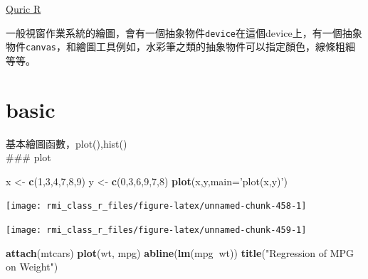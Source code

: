 \documentclass[]{book}
\newenvironment{Shaded}{\begin{snugshade}}{\end{snugshade}}
\newcommand{\DataTypeTok}[1]{\textcolor[rgb]{0.13,0.29,0.53}{#1}}
\newcommand{\DecValTok}[1]{\textcolor[rgb]{0.00,0.00,0.81}{#1}}
\newcommand{\KeywordTok}[1]{\textcolor[rgb]{0.13,0.29,0.53}{\textbf{#1}}}
\newcommand{\NormalTok}[1]{#1}
\newcommand{\OperatorTok}[1]{\textcolor[rgb]{0.81,0.36,0.00}{\textbf{#1}}}
\newcommand{\StringTok}[1]{\textcolor[rgb]{0.31,0.60,0.02}{#1}}
\theoremstyle{definition}
\theoremstyle{definition}
\theoremstyle{definition}
\theoremstyle{remark}
\begin{document}
\href{https://www.statmethods.net/graphs/creating.html}{Quric R}

一般視窗作業系統的繪圖，會有一個抽象物件\texttt{device}在這個device上，有一個抽象物件\texttt{canvas}，和繪圖工具例如，水彩筆之類的抽象物件可以指定顏色，線條粗細等等。

\hypertarget{basic}{%
\section{basic}\label{basic}}

基本繪圖函數，plot(),hist()\\
\#\#\# plot

\begin{Shaded}
\begin{Highlighting}[]
\NormalTok{x <-}\StringTok{ }\KeywordTok{c}\NormalTok{(}\DecValTok{1}\NormalTok{,}\DecValTok{3}\NormalTok{,}\DecValTok{4}\NormalTok{,}\DecValTok{7}\NormalTok{,}\DecValTok{8}\NormalTok{,}\DecValTok{9}\NormalTok{)}
\NormalTok{y <-}\StringTok{ }\KeywordTok{c}\NormalTok{(}\DecValTok{0}\NormalTok{,}\DecValTok{3}\NormalTok{,}\DecValTok{6}\NormalTok{,}\DecValTok{9}\NormalTok{,}\DecValTok{7}\NormalTok{,}\DecValTok{8}\NormalTok{)}
\KeywordTok{plot}\NormalTok{(x,y,}\DataTypeTok{main=}\StringTok{'plot(x,y)'}\NormalTok{)}
\end{Highlighting}
\end{Shaded}

\begin{center}\texttt{[image: rmi\_class\_r\_files/figure-latex/unnamed-chunk-458-1]} \end{center}

\begin{Shaded}
\end{Shaded}

\begin{center}\texttt{[image: rmi\_class\_r\_files/figure-latex/unnamed-chunk-459-1]} \end{center}

\begin{Shaded}
\begin{Highlighting}[]
\KeywordTok{attach}\NormalTok{(mtcars)}
\KeywordTok{plot}\NormalTok{(wt, mpg) }
\KeywordTok{abline}\NormalTok{(}\KeywordTok{lm}\NormalTok{(mpg}\OperatorTok{~}\NormalTok{wt))}
\KeywordTok{title}\NormalTok{(}\StringTok{"Regression of MPG on Weight"}\NormalTok{)}
\end{Highlighting}
\end{Shaded}
\end{document}
